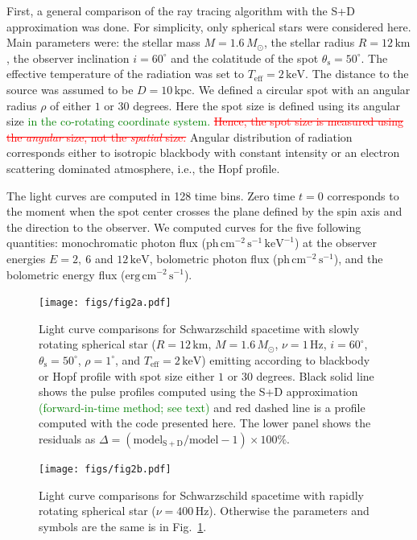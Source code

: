 \documentclass{aa}
\newcommand{\refe}[1]{\textcolor{green}{{#1}}}
\newcommand{\refedel}[1]{\textcolor{red}{\sout{#1}}}
\newcommand{\sch}{Schwarzschild }
\newcommand{\Msun}{\ensuremath{M_{\odot}}}
\begin{document}
First, a general comparison of the ray tracing algorithm with the S+D approximation was done. 
For simplicity, only spherical stars were considered here.
Main parameters were: the stellar mass $M = 1.6\,\Msun$, the stellar radius $R = 12\,\mathrm{km}$, the observer inclination $i = 60^{\circ}$ and the colatitude of the spot $\theta_{\mathrm{s}} = 50^{\circ}$.  
The effective temperature of the radiation was set to $T_{\mathrm{eff}} = 2\,\mathrm{keV}$.  
The distance to the source was assumed to be $D = 10\,\mathrm{kpc}$.  
We defined a circular spot with an angular radius $\rho$ of either $1$ or $30$ degrees.
Here the spot size is defined using its angular size \refe{in the co-rotating coordinate system.}
\refedel{Hence, the spot size is measured using the \textit{angular} size, not the \textit{spatial} size.}
Angular distribution of radiation corresponds either to isotropic blackbody with constant intensity or an electron scattering dominated atmosphere, i.e., the Hopf profile.


The light curves are computed in 128 time bins.  Zero time $t = 0$ corresponds to the moment when the spot center crosses the plane defined by the spin axis and the direction to the observer.  
We computed curves for the five following quantities: monochromatic photon flux ($\mathrm{ph}\,\mathrm{cm}^{-2}\,\mathrm{s}^{-1}\,\mathrm{keV}^{-1}$) at the observer energies $E = 2,~6$ and $12\,\mathrm{keV}$, bolometric photon flux ($\mathrm{ph}\,\mathrm{cm}^{-2}\,\mathrm{s}^{-1}$), and the bolometric energy flux ($\mathrm{erg}\,\mathrm{cm}^{-2}\,\mathrm{s}^{-1}$).


\begin{figure}
\centering
\texttt{[image: figs/fig2a.pdf]}
\caption{\label{fig:sch_comp1}
  Light curve comparisons for \sch spacetime with slowly rotating spherical star ($R = 12\,\mathrm{km}$, $M = 1.6\,\Msun$, $\nu = 1\,\mathrm{Hz}$, $i = 60^{\circ}$, $\theta_{\mathrm{s}} = 50^{\circ}$, $\rho = 1^{\circ}$, and $T_{\mathrm{eff}} = 2\,\mathrm{keV}$) emitting according to blackbody or Hopf profile with spot size either $1$ or $30$ degrees.
    Black solid line shows the pulse profiles computed using the S+D approximation \refe{(forward-in-time method; see text)} and red dashed line is a profile computed with the code presented here.
  The lower panel shows the residuals as $\Delta = (\mathrm{model_{S+D}}/\mathrm{model} -1) \times 100\%$.
}
\end{figure}

\begin{figure}
\centering
\texttt{[image: figs/fig2b.pdf]}
\caption{\label{fig:sch_comp400}
  Light curve comparisons for \sch spacetime with rapidly rotating spherical star ($\nu = 400\,\mathrm{Hz}$).
  Otherwise the parameters and symbols are the same is in Fig.~\ref{fig:sch_comp1}.
}
\end{figure}
\end{document}
